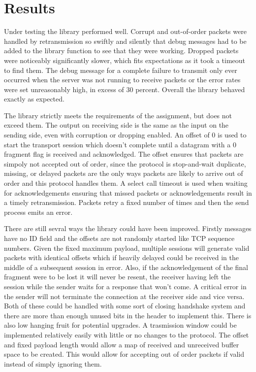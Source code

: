 \documentclass[11pt]{article}
\begin{document}
\section{Results}
\par Under testing the library performed well.  Corrupt and out-of-order packets were handled by retransmission so swiftly and silently that debug messages had to be added to the library function to see that they were working.  Dropped packets were noticeably significantly slower, which fits expectations as it took a timeout to find them.  The debug message for a complete failure to transmit only ever occurred when the server was not running to receive packets or the error rates were set unreasonably high, in excess of 30 percent. Overall the library behaved exactly as expected.
\par The library strictly meets the requirements of the assignment, but does not exceed them.  The output on receiving side is the same as the input on the sending side, even with corruption or dropping enabled.  An offset of 0 is used to start the transport session which doesn't complete until a datagram with a 0 fragment flag is received and acknowledged.  The offset ensures that packets are simpoly not accepted out of order, since the protocol is stop-and-wait duplicate, missing, or delayed packets are the only ways packets are likely to arrive out of order and this protocol handles them.  A select call timeout is used when waiting for acknowledgements ensuring that missed packets or acknowledgements result in a timely retransmission.  Packets retry a fixed number of times and then the send process emits an error.
\par There are still sevral ways the library could have been improved.  Firstly messages have no ID field and the offsets are not randomly started like TCP sequence numbers.  Given the fixed maximum payload, multiple sessions will generate valid packets with identical offsets which if heavily delayed could be received in the middle of a subsequent session in error.  Also, if the acknowledgement of the final fragment were to be lost it will never be resent, the receiver having left the session while the sender waits for a response that won't come.  A critical error in the sender will not terminate the connection at the receiver side and vice versa.  Both of these could be handled with some sort of closing handshake system and there are more than enough unused bits in the header to implement this. There is also low hanging fruit for potential upgrades.  A trasmission window could be implemented relatively easily with little or no changes to the protocol.  The offset and fixed payload length would allow a map of received and unreceived buffer space to be created.  This would allow for accepting out of order packets if valid instead of simply ignoring them.
\end{document}
